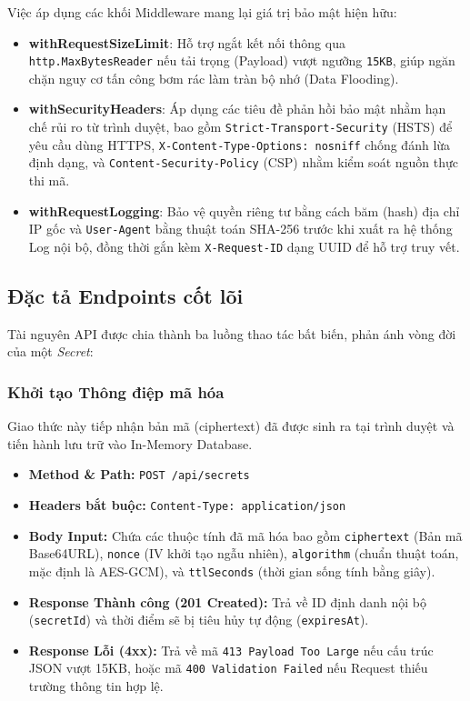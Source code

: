 Việc áp dụng các khối Middleware mang lại giá trị bảo mật hiện hữu:
\begin{itemize}
    \item \textbf{withRequestSizeLimit}: Hỗ trợ ngắt kết nối thông qua \texttt{http.\-MaxBytesReader} nếu tải trọng (Payload) vượt ngưỡng \texttt{15KB}, giúp ngăn chặn nguy cơ tấn công bơm rác làm tràn bộ nhớ (Data Flooding).
    \item \textbf{withSecurityHeaders}: Áp dụng các tiêu đề phản hồi bảo mật nhằm hạn chế rủi ro từ trình duyệt, bao gồm \texttt{Strict-Transport-Security} (HSTS) để yêu cầu dùng HTTPS, \texttt{X-Content-Type-Options: nosniff} chống đánh lừa định dạng, và \texttt{Content-Security-Policy} (CSP) nhằm kiểm soát nguồn thực thi mã.
    \item \textbf{withRequestLogging}: Bảo vệ quyền riêng tư bằng cách băm (hash) địa chỉ IP gốc và \texttt{User-Agent} bằng thuật toán SHA-256 trước khi xuất ra hệ thống Log nội bộ, đồng thời gắn kèm \texttt{X-Request-ID} dạng UUID để hỗ trợ truy vết.
\end{itemize}

\subsection{Đặc tả Endpoints cốt lõi}

Tài nguyên API được chia thành ba luồng thao tác bất biến, phản ánh vòng đời của một \textit{Secret}:

\subsubsection{Khởi tạo Thông điệp mã hóa}
Giao thức này tiếp nhận bản mã (ciphertext) đã được sinh ra tại trình duyệt và tiến hành lưu trữ vào In-Memory Database.
\begin{itemize}
    \item \textbf{Method \& Path:} \texttt{POST /api/secrets}
    \item \textbf{Headers bắt buộc:} \texttt{Content-Type: application/json}
    \item \textbf{Body Input:} Chứa các thuộc tính đã mã hóa bao gồm \texttt{ciphertext} (Bản mã Base64URL), \texttt{nonce} (IV khởi tạo ngẫu nhiên), \texttt{algorithm} (chuẩn thuật toán, mặc định là AES-GCM), và \texttt{ttlSeconds} (thời gian sống tính bằng giây).
    \item \textbf{Response Thành công (201 Created):} Trả về ID định danh nội bộ (\texttt{secretId}) và thời điểm sẽ bị tiêu hủy tự động (\texttt{expiresAt}).
    \item \textbf{Response Lỗi (4xx):} Trả về mã \texttt{413 Payload Too Large} nếu cấu trúc JSON vượt 15KB, hoặc mã \texttt{400 Validation Failed} nếu Request thiếu trường thông tin hợp lệ.
\end{itemize}

